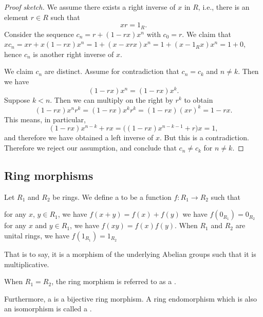 \begin{proof}[Proof sketch]
We assume there exists a right inverse of $x$ in $R$, i.e., there is
an element $r\in R$ such that
\begin{equation}
xr = 1_{R}.
\end{equation}
Consider the sequence $c_{n}=r+(1-rx)x^{n}$ with $c_{0}=r$. We claim
that $xc_{n}=xr+x(1-rx)x^{n}=1+(x-xrx)x^{n}=1+(x-1_{R}x)x^{n}=1+0$,
hence $c_{n}$ is another right inverse of $x$.

We claim $c_{n}$ are distinct. Assume for contradiction that
$c_{n}=c_{k}$ and $n\neq k$. Then we have
\begin{equation}
(1-rx)x^{n}=(1-rx)x^{k}.
\end{equation}
Suppose $k<n$. Then we can multiply on the right by $r^{k}$ to obtain
\begin{equation}
(1-rx)x^{n}r^{k}=(1-rx)x^{k}r^{k}=(1-rx)(xr)^{k}=1-rx.
\end{equation}
This means, in particular,
\begin{equation}
(1-rx)x^{n-k}+rx = \bigl((1-rx)x^{n-k-1}+r\bigr)x=1,
\end{equation}
and therefore we have obtained a left inverse of $x$. But this is a
contradiction. Therefore we reject our assumption, and conclude that
$c_{n}\neq c_{k}$ for $n\neq k$.
\end{proof}

\subsection{Ring morphisms}

\begin{definition}
Let $R_{1}$ and $R_{2}$ be rings. We define a 
to be a function $f\colon R_{1}\to R_{2}$ such that
\begin{itemize}
 for any $x$, $y\in R_{1}$, we have $f(x+y)=f(x)+f(y)$
 we have $f(0_{R_{1}})=0_{R_{2}}$
 for any $x$ and $y\in R_{1}$, we have $f(xy)=f(x)f(y)$.
 When $R_{1}$ and $R_{2}$ are unital rings,
  we have $f(1_{R_{1}})=1_{R_{2}}$
\end{itemize}%
That is to say, it is a morphism of the underlying Abelian groups such
that it is multiplicative.

When $R_{1} = R_{2}$, the ring morphism is referred to as a
.

Furthermore, a  is a bijective ring morphism.
A ring endomorphism which is also an isomorphism is called a
.
\end{definition}

